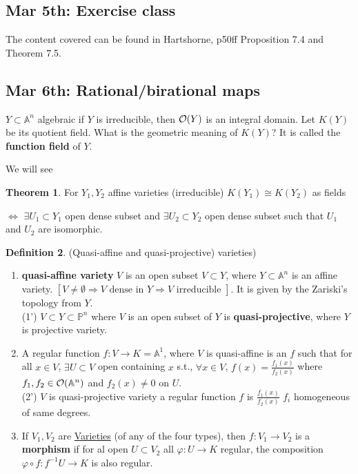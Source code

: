 \documentclass[11pt]{article}
\theoremstyle{definition}
\newtheorem{thm}{Theorem}[section]
\newtheorem{dfn}[thm]{Definition}
\newcommand{\affn}{\mathbb A}
\newcommand{\proj}{\mathbb P}
\newcommand{\calo}{{\cal O}}
\newcommand{\Lrta}{\Longrightarrow}
\newcommand{\lrta}{\longrightarrow}
\newcommand{\Llrta}{\Longleftrightarrow}
\begin{document}
\subsection{Mar 5th: Exercise class}
The content covered can be found in Hartshorne, p50ff Proposition 7.4 and Theorem 7.5.


\subsection{Mar 6th: Rational/birational maps}

$Y\subset \affn^n$ algebraic if $Y$ is irreducible, then $\calo(Y)$ is an integral domain. Let $K(Y)$ be its quotient field. What is the geometric meaning of $K(Y)$? It is called the \textbf{function field} of $Y$.

We will see
\begin{thm}
For $Y_1,Y_2$ affine varieties (irreducible) $K(Y_1)\cong K(Y_2)$ as fields

$\Llrta$ $\exists U_1\subset Y_1$ open dense subset and $\exists U_2\subset Y_2$ open dense subset such that $U_1$ and $U_2$ are isomorphic.
\end{thm}
\begin{dfn}
(Quasi-affine  and quasi-projective) varieties)
\begin{enumerate}%
  \item \textbf{quasi-affine variety} $V$ is an open subset $V\subset Y$, where $Y\subset \affn^n$ is an affine variety. $[V\neq \emptyset\Lrta V\text{ dense in } Y\Lrta V\text{ irreducible }]$. It is given by the Zariski's topology from $Y$.\\
  (1') $V\subset Y\subset \proj^n$ where $V$ is an open subset of $Y$ is \textbf{quasi-projective}, where $Y$ is projective variety.
  \item A regular function $f:V\lrta K=\affn^1$, where $V$ is quasi-affine is an $f$ such that for all $x\in V$, $\exists U\subset V$ open containing $x$ s.t., $\forall x\in V$, $f(x)=\frac{f_1(x)}{f_2(x)}$ where $f_1,f_2\in\calo(\affn^n)$ and $f_2(x)\neq 0$ on $U$.\\
  (2') $V$ is quasi-projective variety a regular function $f$ is $\frac{f_1(x)}{f_2(x)}$ $f_i$ homogeneous of same degrees.
  \item If $V_1,V_2$ are \underline{Varieties} (of any of the four types), then $f:V_1\lrta V_2$ is a \textbf{morphism} if for al open $U\subset V_2$ all $\varphi:U\lrta K$ regular, the composition $\varphi\circ f: f^{-1}U\lrta K$ is also regular.
  \end{enumerate}
\end{dfn}
\end{document}

